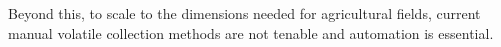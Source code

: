 Beyond this, to scale to the dimensions needed for agricultural fields, current manual volatile collection methods are not tenable and automation is essential. 







